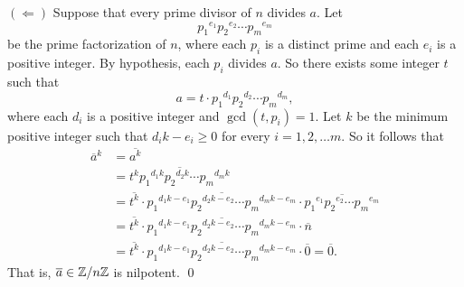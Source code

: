 \begin{enumerate}
\begin{enumerate}
               $(\Leftarrow)$ Suppose that every prime divisor of $n$ divides
               $a$. Let
               $${p_1}^{e_1}{p_2}^{e_2}\cdots {p_m}^{e_m}$$
               be the prime factorization of $n$, where each $p_i$ is a distinct
               prime and each $e_i$ is a positive integer. By hypothesis, each
               $p_i$ divides $a$. So there exists some integer $t$ such that
               $$a = t \cdot {p_1}^{d_1}{p_2}^{d_2}\cdots {p_m}^{d_m},$$
               where each $d_i$ is a positive integer and $\gcd(t, p_i) = 1$.
               Let $k$ be the minimum positive integer such that
               $d_ik - e_i \ge 0$ for every $i = 1, 2, \ldots m$. So it follows
               that
               \begin{align*}
                  \overline{a}^k &= \overline{a^k} \\
                     &= \overline{t^k{p_1}^{d_1k}{p_2}^{d_2k}\cdots
                        {p_m}^{d_mk}} \\
                     &= \overline{t^k} \cdot
                        \overline{{p_1}^{d_1k-e_1}{p_2}^{d_2k-e_2}\cdots
                        {p_m}^{d_mk-e_m}} \cdot
                        \overline{{p_1}^{e_1}{p_2}^{e_2}\cdots {p_m}^{e_m}} \\
                     &= \overline{t^k} \cdot
                        \overline{{p_1}^{d_1k-e_1}{p_2}^{d_2k-e_2}\cdots
                        {p_m}^{d_mk-e_m}} \cdot \overline{n} \\
                     &= \overline{t^k} \cdot
                        \overline{{p_1}^{d_1k-e_1}{p_2}^{d_2k-e_2}\cdots
                        {p_m}^{d_mk-e_m}} \cdot \overline{0} = \overline{0}.
               \end{align*}
               That is, $\overline{a} \in \mathbb{Z}/n\mathbb{Z}$ is nilpotent. \qed


\end{enumerate}
\end{enumerate}
